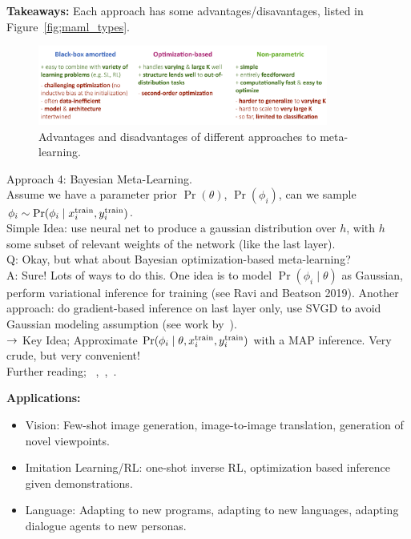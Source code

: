 {\bf Takeaways:} Each approach has some advantages/disavantages, listed in Figure~\ref{fig;maml_types}.
\begin{figure}[h!]
\centering
\includegraphics[width=0.85\textwidth]{images/maml_types.JPG}
\caption{Advantages and disadvantages of different approaches to meta-learning.}
\label{fig:maml_types}
\end{figure}


Approach 4: Bayesian Meta-Learning. \\

Assume we have a parameter prior $\Pr(\theta)$, $\Pr(\phi_i)$, can we sample $\phi_i \sim \Pr(\phi_i \mid x_i^{\text{train}}, y_i^{\text{train}})$. \\

Simple Idea: use neural net to produce a gaussian distribution over $h$, with $h$ some subset of relevant weights of the network (like the last layer). \\


Q: Okay, but what about Bayesian optimization-based meta-learning? \\

A: Sure! Lots of ways to do this. One idea is to model $\Pr(\phi_i \mid \theta)$ as Gaussian, perform variational inference for training (see Ravi and Beatson 2019). Another approach: do gradient-based inference on last layer only, use SVGD to avoid Gaussian modeling assumption (see work by~\citet{liu2016stein}). \\

$\rightarrow$ Key Idea; Approximate $\Pr(\phi_i \mid \theta, x_i^{\text{train}}, y_i^{\text{train}})$ with a MAP inference. Very crude, but very convenient! \\


Further reading; ~\citet{garnelo2018conditional},~\citet{kim2018bayesian},~\citet{ravi2018amortized}.


{\bf Applications:}
\begin{itemize}
\item Vision: Few-shot image generation, image-to-image translation, generation of novel viewpoints.
\item Imitation Learning/RL: one-shot inverse RL, optimization based inference given demonstrations.
\item Language: Adapting to new programs, adapting to new languages, adapting dialogue agents to new personas.
\end{itemize}

